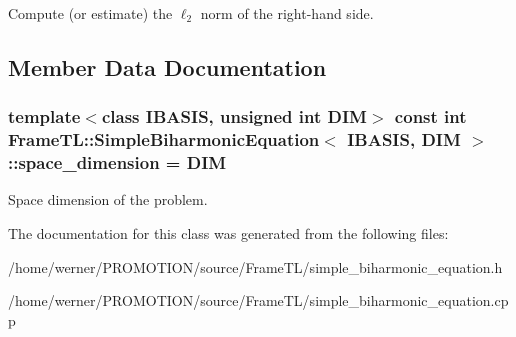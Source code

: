 Compute (or estimate) the $\ell_2$ norm of the right-hand side. 

\subsection{Member Data Documentation}
\hypertarget{classFrameTL_1_1SimpleBiharmonicEquation_286b0e4560f9b71e48db27f7a1f80a37}{
\subsubsection[space\_\-dimension]{\setlength{\rightskip}{0pt plus 5cm}template$<$class IBASIS, unsigned int DIM$>$ const int {\bf FrameTL::SimpleBiharmonicEquation}$<$ IBASIS, DIM $>$::{\bf space\_\-dimension} = DIM}}
\label{classFrameTL_1_1SimpleBiharmonicEquation_286b0e4560f9b71e48db27f7a1f80a37}


Space dimension of the problem. 

The documentation for this class was generated from the following files:\begin{CompactItemize}
\item 
/home/werner/PROMOTION/source/FrameTL/simple\_\-biharmonic\_\-equation.h\item 
/home/werner/PROMOTION/source/FrameTL/simple\_\-biharmonic\_\-equation.cpp\end{CompactItemize}
